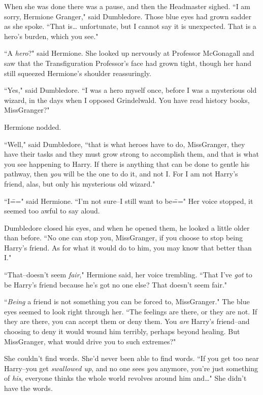 When she was done there was a pause, and then the Headmaster sighed. ``I am sorry, Hermione Granger," said Dumbledore. Those blue eyes had grown sadder as she spoke. ``That is{\ldots} unfortunate, but I cannot say it is unexpected. That is a hero's burden, which you see."

``A \emph{hero}?" said Hermione. She looked up nervously at Professor McGonagall and saw that the Transfiguration Professor's face had grown tight, though her hand still squeezed Hermione's shoulder reassuringly.

``Yes," said Dumbledore. ``I was a hero myself once, before I was a mysterious old wizard, in the days when I opposed Grindelwald. You have read history books, Miss\?Granger?"

Hermione nodded.

``Well," said Dumbledore, ``that is what heroes have to do, Miss\?Granger, they have their tasks and they must grow strong to accomplish them, and that is what you see happening to Harry. If there is anything that can be done to gentle his pathway, then \emph{you} will be the one to do it, and not I\@. For I am not Harry's friend, alas, but only his mysterious old wizard."

``I\===" said Hermione. ``I'm not sure\---I still want to be\===" Her voice stopped, it seemed too awful to say aloud.

Dumbledore closed his eyes, and when he opened them, he looked a little older than before. ``No one can stop you, Miss\?Granger, if you choose to stop being Harry's friend. As for what it would do to him, you may know that better than I."

``That\---doesn't seem \emph{fair}," Hermione said, her voice trembling. ``That I've \emph{got} to be Harry's friend because he's got no one else? That doesn't seem fair."

``\emph{Being} a friend is not something you can be forced to, Miss\?Granger." The blue eyes seemed to look right through her. ``The feelings are there, or they are not. If they are there, you can accept them or deny them. You \emph{are} Harry's friend\---and choosing to deny it would wound him terribly, perhaps beyond healing. But Miss\?Granger, what would drive you to such extremes?"

She couldn't find words. She'd never been able to find words. ``If you get too near Harry\---you get \emph{swallowed up}, and no one sees \emph{you} anymore, you're just something of \emph{his}, everyone thinks the whole world revolves around him and{\ldots}" She didn't have the words.

